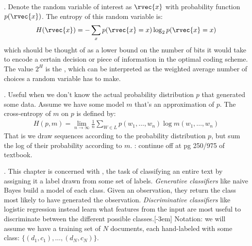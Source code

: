 \documentclass[11pt]{article}
\newcommand\myspace[1][]{\vspace{#1\bigskipamount}}
\newcommand\p{\Needspace{10\baselineskip} \noindent}
\begin{document}
\myspace
\p {}. Denote the random variable of interest as $\rvec{x}$ with probability function $p(\rvec{x})$. The entropy of this random variable is:
\begin{align}
	H(\rvec{x}) = -\sum_x p(\rvec{x} = x) \log_2 p(\rvec{x} = x)
\end{align}
which should be thought of as a lower bound on the number of bits it would take to encode a certain decision or piece of information in the optimal coding scheme. The value $2^H$ is the , which can be interpreted as the weighted average number of choices a random variable has to make.

\myspace
\p {}. Useful when we don't know the actual probability distribution $p$ that generated some data. Assume we have some model $m$ that's an approximation of $p$. The cross-entropy of $m$ on $p$ is defined by:
\begin{align}
	H(p, m) = \lim_{n \rightarrow \infty} \frac{1}{n} \sum_{W \in L} 
	p(w_1, \ldots, w_n) \log m(w_1, \ldots, w_n)
\end{align}
That is we draw sequences according to the probability distribution $p$, but sum the log of their probability according to $m$. : continue off at pg 250/975 of textbook.















\p {}. This chapter is concerned with , the task of classifying an entire text by assigning it a label drawn from some set of labels. \textit{Generative classifiers} like naive Bayes build a model of each class. Given an observation, they return the class most likely to have generated the observation. \textit{Discriminative classifiers} like logistic regression instead learn what features from the input are most useful to discriminate between the different possible classes.[-3em] Notation: we will assume we have a training set of $N$ documents, each hand-labeled with some class: $\{(d_1, c_1), \ldots, (d_N, c_N) \}$. 
\end{document}
